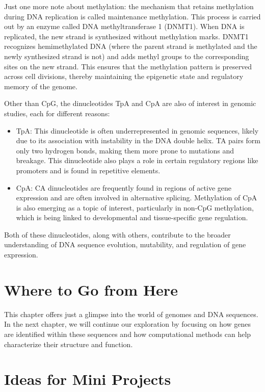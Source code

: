 Just one more note about methylation: the mechanism that retains methylation during DNA replication is called maintenance methylation. This process is carried out by an enzyme called DNA methyltransferase 1 (DNMT1). When DNA is replicated, the new strand is synthesized without methylation marks. DNMT1 recognizes hemimethylated DNA (where the parent strand is methylated and the newly synthesized strand is not) and adds methyl groups to the corresponding sites on the new strand. This ensures that the methylation pattern is preserved across cell divisions, thereby maintaining the epigenetic state and regulatory memory of the genome.

Other than CpG, the dinucleotides TpA and CpA are also of interest in genomic studies, each for different reasons:

\begin{itemize}
    \item TpA: This dinucleotide is often underrepresented in genomic sequences, likely due to its association with instability in the DNA double helix. TA pairs form only two hydrogen bonds, making them more prone to mutations and breakage. This dinucleotide also plays a role in certain regulatory regions like promoters and is found in repetitive elements.
    
    \item CpA: CA dinucleotides are frequently found in regions of active gene expression and are often involved in alternative splicing. Methylation of CpA is also emerging as a topic of interest, particularly in non-CpG methylation, which is being linked to developmental and tissue-specific gene regulation.
\end{itemize}

Both of these dinucleotides, along with others, contribute to the broader understanding of DNA sequence evolution, mutability, and regulation of gene expression.

\section{Where to Go from Here}

This chapter offers just a glimpse into the world of genomes and DNA sequences. In the next chapter, we will continue our exploration by focusing on how genes are identified within these sequences and how computational methods can help characterize their structure and function.

\section*{Ideas for Mini Projects}

